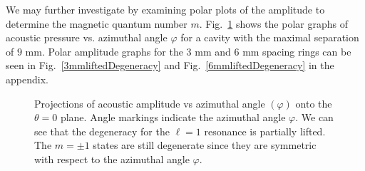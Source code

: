 \documentclass[12pt]{article}
\newcommand{\figref}[1]{Fig.\ \ref{#1}}
\begin{document}
	
	
		We may further investigate by examining polar plots of the amplitude to determine the magnetic quantum number $m$. \figref{9mmPolarliftedDegeneracy} shows the polar graphs of acoustic pressure vs. azimuthal angle $\varphi$ for a cavity with the maximal separation of $9$ mm. Polar amplitude graphs for the $3$ mm and $6$ mm spacing rings can be seen in \figref{3mmliftedDegeneracy} and \figref{6mmliftedDegeneracy} in the appendix.
		
		\begin{figure}[H]
			\centering
			\qquad
			\caption{Projections of acoustic amplitude vs azimuthal angle $(\varphi)$ onto the $\theta=0$ plane. Angle markings indicate the azimuthal angle $\varphi$. We can see that the degeneracy for the $\ell=1$ resonance is partially lifted. The $m=\pm1$ states are still degenerate since they are symmetric with respect to the azimuthal angle $\varphi$.}
			\label{9mmPolarliftedDegeneracy}		
		\end{figure}
\end{document}
